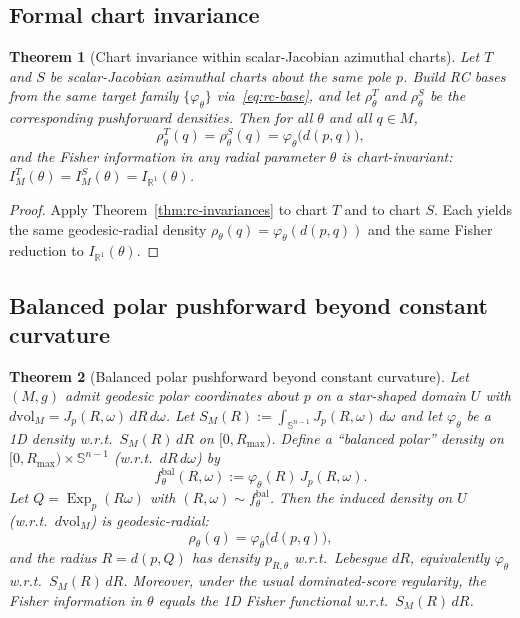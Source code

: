 \documentclass{article}
\newtheorem{theorem}{Theorem}
\theoremstyle{definition}
\theoremstyle{remark}
\newcommand{\RR}{\mathbb{R}}
\newcommand{\SSS}{\mathbb{S}}
\newcommand{\Exp}{\operatorname{Exp}}
\begin{document}
\subsection{Formal chart invariance}
\label{app:chart_invariance}

\begin{theorem}[Chart invariance within scalar-Jacobian azimuthal charts]
\label{thm:chart_invariance}
Let $T$ and $S$ be scalar-Jacobian azimuthal charts about the same pole $p$.
Build RC bases from the same target family $\{\varphi_\theta\}$ via~\eqref{eq:rc-base},
and let $\rho_\theta^{T}$ and $\rho_\theta^{S}$ be the corresponding pushforward densities.
Then for all $\theta$ and all $q\in M$,
\[
\rho_\theta^{T}(q)=\rho_\theta^{S}(q)=\varphi_\theta\!\bigl(d(p,q)\bigr),
\]
and the Fisher information in any radial parameter $\theta$ is chart-invariant:
$I_M^T(\theta)=I_M^S(\theta)=I_{\RR^1}(\theta)$.
\end{theorem}

\begin{proof}
Apply Theorem~\ref{thm:rc-invariances} to chart $T$ and to chart $S$.
Each yields the same geodesic-radial density $\rho_\theta(q)=\varphi_\theta(d(p,q))$
and the same Fisher reduction to $I_{\RR^1}(\theta)$.
\end{proof}


\subsection{Balanced polar pushforward beyond constant curvature}
\label{app:balanced_polar}


\begin{theorem}[Balanced polar pushforward beyond constant curvature]
\label{thm:balanced-polar}
Let $(M,g)$ admit geodesic polar coordinates about $p$ on a star-shaped domain $U$ with
$d\mathrm{vol}_M=J_p(R,\omega)\,dR\,d\omega$.
Let $S_M(R):=\int_{\SSS^{n-1}}J_p(R,\omega)\,d\omega$ and let $\varphi_\theta$ be a 1D density
w.r.t.\ $S_M(R)\,dR$ on $[0,R_{\max})$.
Define a ``balanced polar'' density on $[0,R_{\max})\times\SSS^{n-1}$ (w.r.t.\ $dR\,d\omega$) by
\[
f^{\mathrm{bal}}_\theta(R,\omega) := \varphi_\theta(R)\,J_p(R,\omega).
\]
Let $Q=\Exp_p(R\omega)$ with $(R,\omega)\sim f^{\mathrm{bal}}_\theta$. Then the induced density on $U$
(w.r.t.\ $d\mathrm{vol}_M$) is geodesic-radial:
\[
\rho_\theta(q)=\varphi_\theta\!\bigl(d(p,q)\bigr),
\]
and the radius $R=d(p,Q)$ has density $p_{R,\theta}$ w.r.t.\ Lebesgue $dR$, equivalently $\varphi_\theta$ w.r.t.\ $S_M(R)\,dR$.
Moreover, under the usual dominated-score regularity, the Fisher information in $\theta$ equals
the 1D Fisher functional w.r.t.\ $S_M(R)\,dR$.
\end{theorem}
\end{document}

